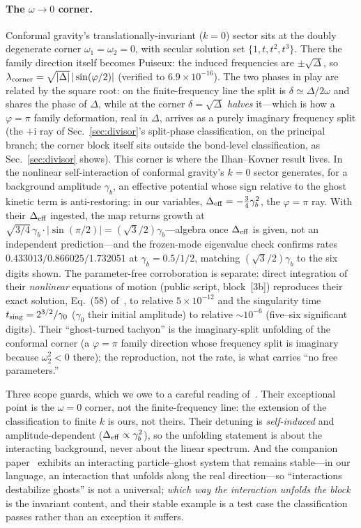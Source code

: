 ﻿\documentclass[11pt]{article}
\newcommand{\ii}{\mathrm{i}}
\theoremstyle{remark}
\begin{document}
\paragraph{The $\omega\to0$ corner.} Conformal gravity's
translationally-invariant ($k=0$) sector sits at the doubly
degenerate corner $\omega_1=\omega_2=0$, with secular solution set
$\{1,t,t^2,t^3\}$. There the family direction itself becomes
Puiseux: the induced frequencies are $\pm\sqrt{\Delta}$, so
$\lambda_{\rm corner}=\sqrt{|\Delta|}\,|\sin(\varphi/2)|$ (verified
to $6.9\times10^{-16}$). The two phases in play are related by the
square root: on the finite-frequency line the split is
$\delta\simeq\Delta/2\omega$ and shares the phase of $\Delta$,
while at the corner $\delta=\sqrt\Delta$ \emph{halves} it---which
is how a $\varphi=\pi$ family deformation, real in $\Delta$,
arrives as a purely imaginary frequency split (the $+\ii$ ray of
Sec.~\ref{sec:divisor}'s split-phase classification, on the
principal branch; the corner block itself sits outside the
bond-level classification, as Sec.~\ref{sec:divisor} shows). This corner
is where the Ilhan--Kovner result lives. In~\cite{IK2014} the nonlinear
self-interaction of conformal gravity's $k=0$ sector generates, for
a background amplitude $\gamma_b$, an effective potential whose
sign relative to the ghost kinetic term is anti-restoring: in our
variables, $\Delta_{\rm eff}=-\tfrac34\gamma_b^2$, the
$\varphi=\pi$ ray. With their $\Delta_{\rm eff}$ ingested, the map
returns growth at
$\sqrt{3/4}\,\gamma_b\cdot|\sin(\pi/2)|=(\sqrt3/2)\gamma_b$---algebra
once $\Delta_{\rm eff}$ is given, not an independent
prediction---and the frozen-mode eigenvalue check confirms rates
$0.433013/0.866025/1.732051$ at $\gamma_b=0.5/1/2$, matching
$(\sqrt3/2)\gamma_b$ to the six digits shown. The parameter-free
corroboration is separate: direct integration of their
\emph{nonlinear} equations of motion (public script, block~[3b])
reproduces their exact solution, Eq.~(58) of~\cite{IK2014}, to
relative $5\times10^{-12}$ and the singularity time
$t_{\rm sing}=2^{3/2}/\gamma_0$ ($\gamma_0$ their initial amplitude) to
relative $\sim10^{-6}$ (five--six significant digits).
Their ``ghost-turned tachyon'' is the
imaginary-split unfolding of the conformal corner (a $\varphi=\pi$
family direction whose frequency split is imaginary because
$\omega_2^2<0$ there); the reproduction, not the rate, is what
carries ``no free parameters.''

Three scope guards, which we owe to a careful reading
of~\cite{IK2014,IK2013}. Their exceptional point is the
$\omega=0$ corner, not the finite-frequency line: the extension of
the classification to finite $k$ is ours, not theirs. Their
detuning is \emph{self-induced} and amplitude-dependent
($\Delta_{\rm eff}\propto\gamma_b^2$), so the unfolding statement
is about the interacting background, never about the linear
spectrum. And the companion paper~\cite{IK2013} exhibits an
interacting particle--ghost system that remains stable---in our
language, an interaction that unfolds along the real
direction---so ``interactions destabilize ghosts'' is not a
universal; \emph{which way the interaction unfolds the block} is
the invariant content, and their stable example is a test case the
classification passes rather than an exception it suffers.
\end{document}
